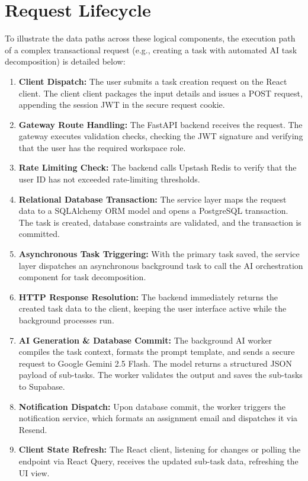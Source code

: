 \section{Request Lifecycle}
To illustrate the data paths across these logical components, the execution path of a complex transactional request (e.g., creating a task with automated AI task decomposition) is detailed below:
\begin{enumerate}
    \item \textbf{Client Dispatch:} The user submits a task creation request on the React client. The client client packages the input details and issues a POST request, appending the session JWT in the secure request cookie.
    \item \textbf{Gateway Route Handling:} The FastAPI backend receives the request. The gateway executes validation checks, checking the JWT signature and verifying that the user has the required workspace role.
    \item \textbf{Rate Limiting Check:} The backend calls Upstash Redis to verify that the user ID has not exceeded rate-limiting thresholds.
    \item \textbf{Relational Database Transaction:} The service layer maps the request data to a SQLAlchemy ORM model and opens a PostgreSQL transaction. The task is created, database constraints are validated, and the transaction is committed.
    \item \textbf{Asynchronous Task Triggering:} With the primary task saved, the service layer dispatches an asynchronous background task to call the AI orchestration component for task decomposition.
    \item \textbf{HTTP Response Resolution:} The backend immediately returns the created task data to the client, keeping the user interface active while the background processes run.
    \item \textbf{AI Generation \& Database Commit:} The background AI worker compiles the task context, formats the prompt template, and sends a secure request to Google Gemini 2.5 Flash. The model returns a structured JSON payload of sub-tasks. The worker validates the output and saves the sub-tasks to Supabase.
    \item \textbf{Notification Dispatch:} Upon database commit, the worker triggers the notification service, which formats an assignment email and dispatches it via Resend.
    \item \textbf{Client State Refresh:} The React client, listening for changes or polling the endpoint via React Query, receives the updated sub-task data, refreshing the UI view.
\end{enumerate}

